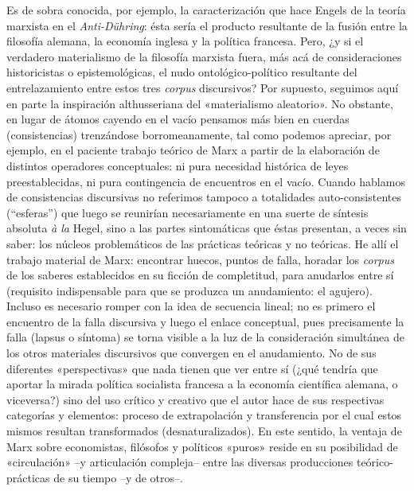 Es de sobra conocida, por ejemplo, la caracterización que hace Engels de la teoría marxista en el \emph{Anti-Dühring}: ésta sería el producto resultante de la fusión entre la filosofía alemana, la economía inglesa y la política francesa. Pero, ¿y si el verdadero materialismo de la filosofía marxista fuera, más acá de consideraciones historicistas o epistemológicas, el nudo ontológico-político resultante del entrelazamiento entre estos tres \emph{corpus} discursivos? Por supuesto, seguimos aquí en parte la inspiración althusseriana del «materialismo aleatorio». No obstante, en lugar de átomos cayendo en el vacío pensamos más bien en cuerdas (consistencias) trenzándose borromeanamente, tal como podemos apreciar, por ejemplo, en el paciente trabajo teórico de Marx a partir de la elaboración de distintos operadores conceptuales: ni pura necesidad histórica de leyes preestablecidas, ni pura contingencia de encuentros en el vacío. Cuando hablamos de consistencias discursivas no referimos tampoco a totalidades auto-consistentes (``esferas'') que luego se reunirían necesariamente en una suerte de síntesis absoluta \emph{à la} Hegel, sino a las partes sintomáticas que éstas presentan, a veces sin saber: los núcleos problemáticos de las prácticas teóricas y no teóricas. He allí el trabajo material de Marx: encontrar huecos, puntos de falla, horadar los \emph{corpus} de los saberes establecidos en su ficción de completitud, para anudarlos entre sí (requisito indispensable para que se produzca un anudamiento: el agujero). Incluso es necesario romper con la idea de secuencia lineal; no es primero el encuentro de la falla discursiva y luego el enlace conceptual, pues precisamente la falla (lapsus o síntoma) se torna visible a la luz de la consideración simultánea de los otros materiales discursivos que convergen en el anudamiento. No de sus diferentes «perspectivas» que nada tienen que ver entre sí (¿qué tendría que aportar la mirada política socialista francesa a la economía científica alemana, o viceversa?) sino del uso crítico y creativo que el autor hace de sus respectivas categorías y elementos: proceso de extrapolación y transferencia por el cual estos mismos resultan transformados (desnaturalizados). En este sentido, la ventaja de Marx sobre economistas, filósofos y políticos «puros» reside en su posibilidad de «circulación» --y articulación compleja-- entre las diversas producciones teórico-prácticas de su tiempo --y de otros--.

